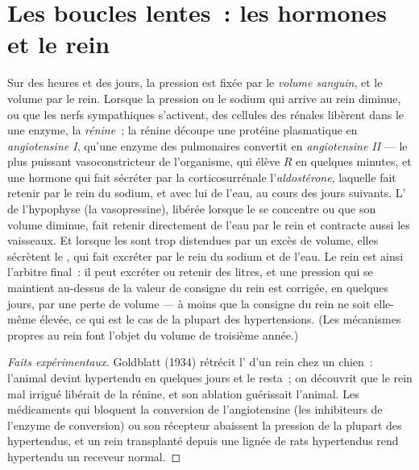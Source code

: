 \section{Les boucles lentes~: les hormones et le rein}

\begin{proposition}\label{prop:b2:blood-pressure:raas}
Sur des heures et des jours, la pression est fixée par le \emph{volume
sanguin}, et le volume par le rein. Lorsque la pression ou le sodium qui
arrive au rein diminue, ou que les nerfs sympathiques s'activent, des
cellules des  rénales libèrent dans le  une enzyme, la
\emph{rénine}~; la rénine découpe une protéine plasmatique en
\emph{angiotensine I}, qu'une enzyme des  pulmonaires
convertit en \emph{angiotensine II} --- le plus puissant vasoconstricteur
de l'organisme, qui élève $R$ en quelques minutes, et une hormone qui
fait sécréter par la corticosurrénale l'\emph{aldostérone}, laquelle fait
retenir par le rein du sodium, et avec lui de l'eau, au cours des jours
suivants. L'\emph{} de l'hypophyse (la
vasopressine), libérée lorsque le  se concentre ou que son volume
diminue, fait retenir directement de l'eau par le rein et contracte
aussi les vaisseaux. Et lorsque les  sont trop distendues par
un excès de volume, elles sécrètent le \emph{}, qui
fait excréter par le rein du sodium et de l'eau. Le rein est ainsi
l'arbitre final~: il peut excréter ou retenir des litres, et une
pression qui se maintient au-dessus de la valeur de consigne du rein est
corrigée, en quelques jours, par une perte de volume --- à moins que la
consigne du rein ne soit elle-même élevée, ce qui est le cas de la
plupart des hypertensions. (Les mécanismes propres au rein font l'objet
du volume de troisième année.)
\end{proposition}
\begin{proof}[Faits expérimentaux]
Goldblatt (1934) rétrécit l' d'un rein chez un chien~: l'animal
devint hypertendu en quelques jours et le resta~; on découvrit que le
rein mal irrigué libérait de la rénine, et son ablation guérissait
l'animal. Les médicaments qui bloquent la conversion de l'angiotensine
(les inhibiteurs de l'enzyme de conversion) ou son récepteur abaissent
la pression de la plupart des hypertendus, et un rein transplanté depuis
une lignée de rats hypertendus rend hypertendu un receveur normal.
\end{proof}

